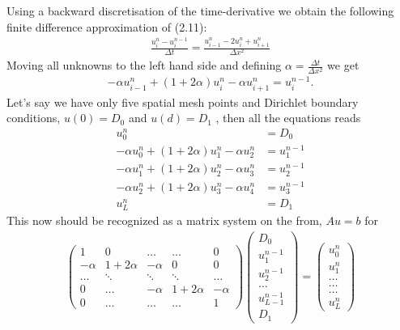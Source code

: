 \documentclass[11pt,a4paper,final]{article}
\numberwithin{equation}{section}
\begin{document}
Using a backward discretisation of the time-derivative we obtain the following finite difference approximation of (2.11):
\begin{align}
\frac{u_{i}^{n}-u_{i}^{n-1}}{\Delta t} = \frac{u_{i-1}^{n}-2u_{i}^{n}+u_{i+1}^{n}}{\Delta x^2}
\end{align}
Moving all unknowns to the left hand side and defining $\alpha = \frac{\Delta t}{\Delta x^2}$ we get
\begin{align*}
-\alpha u_{i-1}^n + (1+2\alpha)u_i^n - \alpha u_{i+1}^n = u_i^{n-1}. 
\end{align*}
Let's say we have only five spatial mesh points and Dirichlet boundary conditions, $u(0)=D_0$ and $u(d)=D_1$ , then all the equations reads
\begin{align*}
u_0^n &= D_0 \\
-\alpha u_{0}^n + (1+2\alpha)u_1^n - \alpha u_{2}^n &= u_1^{n-1} \\
-\alpha u_{1}^n + (1+2\alpha)u_2^n - \alpha u_{3}^n &= u_2^{n-1} \\
-\alpha u_{2}^n + (1+2\alpha)u_3^n - \alpha u_{4}^n &= u_3^{n-1} \\
u_L^n &= D_1 
\end{align*}
This now should be recognized as a matrix system on the from, $Au=b$ for 
\begin{align}
\begin{pmatrix} 1 & 0 & \dots   & \dots         & 0 \\
                -\alpha & 1+2\alpha & -\alpha & 0           &0 \\
        \dots  & \ddots & \ddots & \ddots         & \dots\\
 0   & \dots &  -\alpha & 1+2\alpha & -\alpha \\
 0   & \dots & \dots & \dots    &  1
             \end{pmatrix}
\begin{pmatrix} D_0 \\
      u_1^{n-1} \\
      u_2^{n-1}\\ \dots\\ u_{L-1}^{n-1}\\
      D_1
\end{pmatrix} 
=  \begin{pmatrix} u_0^n \\
                   u_1^n  \\
           \dots\\ \dots\\ \dots\\
                   u_L^n 
             \end{pmatrix} 
\end{align} 
\end{document}
